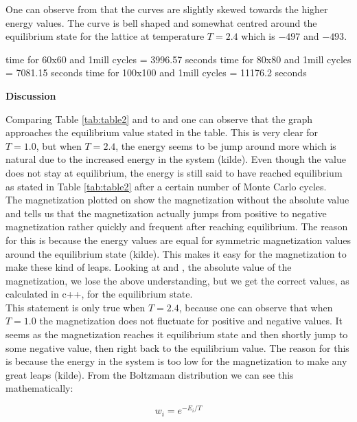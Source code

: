 \documentclass[10pt,a4paper]{article}
\begin{document}
One can observe from  that the curves are slightly skewed towards the higher energy values. The curve is bell shaped and somewhat centred around the equilibrium state for the lattice at temperature $T = 2.4$ which is $-497$ and $-493$. 

\noindent time for 60x60 and 1mill cycles = 3996.57 seconds
\noindent time for 80x80 and 1mill cycles = 7081.15 seconds
\noindent time for 100x100 and 1mill cycles = 11176.2 seconds

\newpage

\begin{center}
{\LARGE\bf Discussion}
\end{center}

\noindent Comparing Table \ref{tab:table2} and to  and  one can observe that the graph approaches the equilibrium value stated in the table. This is very clear for $T = 1.0$, but when $T = 2.4$, the energy seems to be jump around more which is natural due to the increased energy in the system (kilde). Even though the value does not stay at equilibrium, the energy is still said to have reached equilibrium as stated in Table \ref{tab:table2} after a certain number of Monte Carlo cycles.
\\
The magnetization plotted on   show the magnetization without the absolute value and tells us that the magnetization actually jumps from positive to negative magnetization rather quickly and frequent after reaching equilibrium. The reason for this is because the energy values are equal for symmetric magnetization values around the equilibrium state (kilde). This makes it easy for the magnetization to make these kind of leaps. Looking at  and , the absolute value of the magnetization, we lose the above understanding, but we get the correct values, as calculated in c++, for the equilibrium state.
\\
This statement is only true when $T = 2.4$, because one can observe that when $T = 1.0$ the magnetization does not fluctuate for positive and negative values. It seems as the magnetization reaches it equilibrium state and then shortly jump to some negative value, then right back to the equilibrium value. The reason for this is because the energy in the system is too low for the magnetization to make any great leaps (kilde). From the Boltzmann distribution we can see this mathematically:

$$
w_i = e^{-E_i/T}
$$
\end{document}
